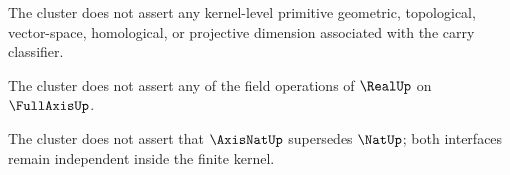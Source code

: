 \begin{theorem}
\label{thm:cannot-claim-dimLift-primitive-horizon}
The cluster does not assert any kernel-level primitive geometric, topological, vector-space, homological, or projective dimension associated with the carry classifier.
\end{theorem}

\begin{theorem}
\label{thm:cannot-claim-fullAxis-is-real-horizon}
The cluster does not assert any of the field operations of \(\RealUp\) on \(\FullAxisUp\).
\end{theorem}

\begin{theorem}
\label{thm:cannot-claim-axisNat-replaces-natUp-horizon}
The cluster does not assert that \(\AxisNatUp\) supersedes \(\NatUp\); both interfaces remain independent inside the finite kernel.
\end{theorem}

